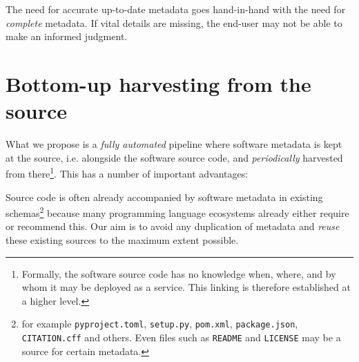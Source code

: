 \documentclass[a4paper,11pt]{article}
\begin{document}
The need for accurate up-to-date metadata goes hand-in-hand with the need for
\emph{complete} metadata. If vital details are missing, the
end-user may not be able to make an informed judgment.


\section{Bottom-up harvesting from the source}

What we propose is a \emph{fully automated} pipeline where software metadata is
kept at the source, i.e. alongside the software source code, and \emph{periodically} harvested from there\footnote{Formally, the software source code has
no knowledge when, where, and by whom it may be deployed as a service. This linking is
therefore established at a higher level.}. This has a number of important advantages: 



Source code is often already accompanied by software metadata in existing
schemas\footnote{for example \texttt{pyproject.toml}, \texttt{setup.py}, \texttt{pom.xml}, \texttt{package.json}, \texttt{CITATION.cff} and others. Even files such as \texttt{README} and \texttt{LICENSE} may be a source for certain metadata.} because many programming language ecosystems already either require or
recommend this. Our aim is to avoid any duplication of metadata and
\emph{reuse} these existing sources to the maximum extent possible.

\end{document}

